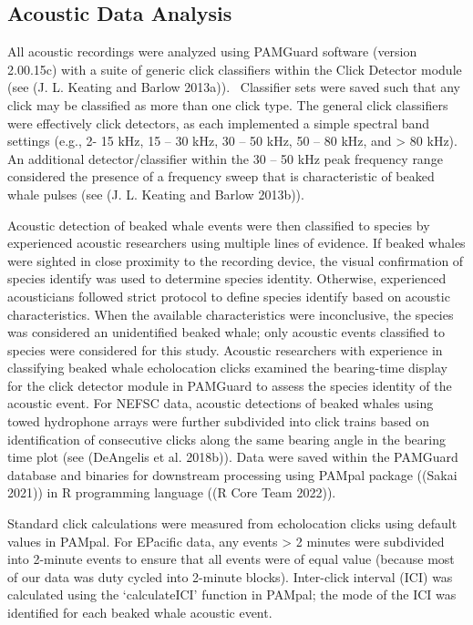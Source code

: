 \documentclass[
  letterpaper,
  DIV=11,
  numbers=noendperiod]{scrartcl}
\begin{document}
\hypertarget{acoustic-data-analysis}{%
\subsection{Acoustic Data Analysis}\label{acoustic-data-analysis}}

All acoustic recordings were analyzed using PAMGuard software (version
2.00.15c) with a suite of generic click classifiers within the Click
Detector module (see (J. L. Keating and Barlow 2013a)).~ Classifier sets
were saved such that any click may be classified as more than one click
type. The general click classifiers were effectively click detectors, as
each implemented a simple spectral band settings (e.g., 2- 15 kHz, 15 --
30 kHz, 30 -- 50 kHz, 50 -- 80 kHz, and \textgreater{} 80 kHz). An
additional detector/classifier within the 30 -- 50 kHz peak frequency
range considered the presence of a frequency sweep that is
characteristic of beaked whale pulses (see (J. L. Keating and Barlow
2013b)).

Acoustic detection of beaked whale events were then classified to
species by experienced acoustic researchers using multiple lines of
evidence. If beaked whales were sighted in close proximity to the
recording device, the visual confirmation of species identify was used
to determine species identity. Otherwise, experienced acousticians
followed strict protocol to define species identify based on acoustic
characteristics. When the available characteristics were inconclusive,
the species was considered an unidentified beaked whale; only acoustic
events classified to species were considered for this study. Acoustic
researchers with experience in classifying beaked whale echolocation
clicks examined the bearing-time display for the click detector module
in PAMGuard to assess the species identity of the acoustic event. For
NEFSC data, acoustic detections of beaked whales using towed hydrophone
arrays were further subdivided into click trains based on identification
of consecutive clicks along the same bearing angle in the bearing time
plot (see (DeAngelis et al. 2018b)). Data were saved within the PAMGuard
database and binaries for downstream processing using PAMpal package
((Sakai 2021)) in R programming language ((R Core Team 2022)).

Standard click calculations were measured from echolocation clicks using
default values in PAMpal. For EPacific data, any events \textgreater{} 2
minutes were subdivided into 2-minute events to ensure that all events
were of equal value (because most of our data was duty cycled into
2-minute blocks). Inter-click interval (ICI) was calculated using the
`calculateICI' function in PAMpal; the mode of the ICI was identified
for each beaked whale acoustic event.
\end{document}

